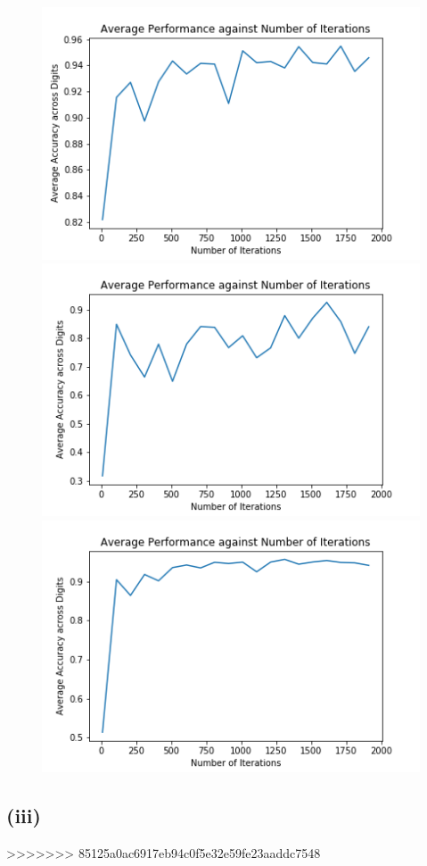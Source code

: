 \documentclass[twoside,11pt]{homework}
\begin{document}
	\begin{figure}[H]
		\includegraphics[]{q6/img/iterations_v0.png}
		\includegraphics[]{q6/img/iterations_v1.png}
		\includegraphics[]{q6/img/iterations_v2.png}
	\end{figure}




\subsection*{(iii)}

>>>>>>> 85125a0ac6917eb94c0f5e32e59fe23aaddc7548
\end{document}
